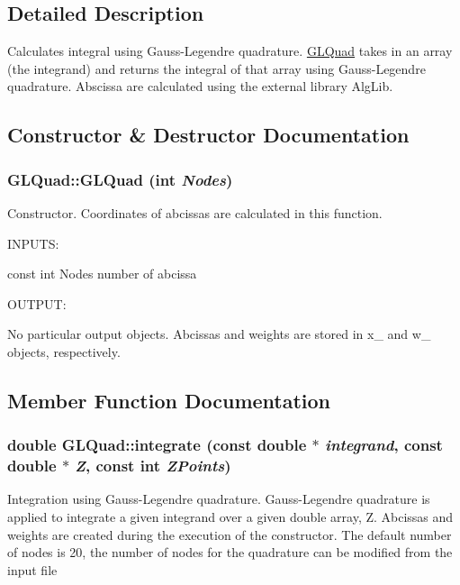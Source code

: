 \subsection{Detailed Description}
Calculates integral using Gauss-\/Legendre quadrature. \hyperlink{classGLQuad}{GLQuad} takes in an array (the integrand) and returns the integral of that array using Gauss-\/Legendre quadrature. Abscissa are calculated using the external library AlgLib. 

\subsection{Constructor \& Destructor Documentation}
\hypertarget{classGLQuad_a835d29af2507b6b2716794d3371d2ba8}{
\subsubsection[{GLQuad}]{\setlength{\rightskip}{0pt plus 5cm}GLQuad::GLQuad (int {\em Nodes})}}
\label{db/d06/classGLQuad_a835d29af2507b6b2716794d3371d2ba8}


Constructor. Coordinates of abcissas are calculated in this function.

INPUTS:

const int Nodes number of abcissa

OUTPUT:

No particular output objects. Abcissas and weights are stored in x\_\- and w\_\- objects, respectively. 

\subsection{Member Function Documentation}
\hypertarget{classGLQuad_a951e36d849cfadc749a62218212802b6}{
\subsubsection[{integrate}]{\setlength{\rightskip}{0pt plus 5cm}double GLQuad::integrate (const double $\ast$ {\em integrand}, \/  const double $\ast$ {\em Z}, \/  const int {\em ZPoints})}}
\label{db/d06/classGLQuad_a951e36d849cfadc749a62218212802b6}


Integration using Gauss-\/Legendre quadrature. Gauss-\/Legendre quadrature is applied to integrate a given integrand over a given double array, Z. Abcissas and weights are created during the execution of the constructor. The default number of nodes is 20, the number of nodes for the quadrature can be modified from the input file


